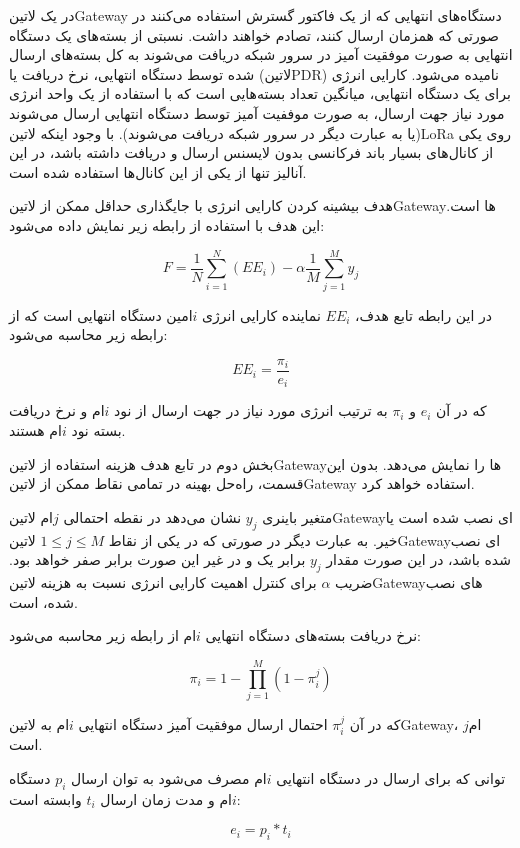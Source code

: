 در یک ‌لاتین{Gateway} دستگاه‌های انتهایی که از یک فاکتور گسترش استفاده می‌کنند در صورتی که همزمان ارسال کنند،
تصادم خواهند داشت. نسبتی از بسته‌های یک دستگاه انتهایی به صورت موفقیت آمیز در سرور شبکه دریافت می‌شوند به کل
بسته‌های ارسال شده توسط دستگاه انتهایی، نرخ دریافت یا (‌لاتین{PDR}) نامیده می‌شود.
کارایی انرژی برای یک دستگاه انتهایی، میانگین تعداد بسته‌هایی است که
با استفاده از یک واحد انرژی مورد نیاز جهت ارسال،
به صورت موففیت آمیز توسط دستگاه انتهایی ارسال
می‌شوند (یا به عبارت دیگر در سرور شبکه دریافت می‌شوند).
با وجود اینکه ‌لاتین{LoRa} روی یکی از کانال‌های بسیار باند فرکانسی بدون لایسنس ارسال و دریافت
داشته باشد، در این آنالیز تنها از یکی از این کانال‌ها استفاده شده است.

هدف بیشینه کردن کارایی انرژی با جایگذاری حداقل ممکن از ‌لاتین{Gateway}ها است.
این هدف با استفاده از رابطه زیر نمایش داده می‌شود:

\[
  F = \frac{1}{N} \sum_{i=1}^{N}(EE_{i}) - \alpha \frac{1}{M} \sum_{j=1}^{M}y_{j}
\]

در این رابطه تابع هدف،
$EE_{i}$
نماینده کارایی انرژی $i$امین دستگاه انتهایی است که از رابطه زیر محاسبه می‌شود:

\[
  EE_{i} = \frac{\pi_{i}}{e_{i}}
\]

که در آن $e_{i}$ و $\pi_{i}$
به ترتیب انرژی مورد نیاز در جهت ارسال از نود $i$ام
و نرخ دریافت بسته نود $i$ام هستند.

بخش دوم در تابع هدف هزینه استفاده از ‌لاتین{Gateway}ها را نمایش می‌دهد.
بدون این قسمت، راه‌حل بهینه در تمامی نقاط ممکن از ‌لاتین{Gateway} استفاده
خواهد کرد.

متغیر باینری $y_{j}$ نشان می‌دهد در نقطه احتمالی $j$ام
‌لاتین{Gateway}ای نصب شده است یا خیر. به عبارت دیگر
در صورتی که در یکی از نقاط
$1 \le j \le M$
‌لاتین{Gateway}ای نصب شده باشد، در این صورت مقدار $y_{j}$ برابر یک و در غیر این صورت برابر صفر خواهد بود.
ضریب $\alpha$ برای کنترل اهمیت کارایی انرژی نسبت به هزینه ‌لاتین{Gateway}های نصب شده، است.

نرخ دریافت بسته‌های دستگاه انتهایی $i$ام از رابطه زیر محاسبه می‌شود:

\[
  \pi_{i} = 1 - \prod_{j=1}^{M}(1 - \pi_{i}^{j})
\]

که در آن $\pi_{i}^{j}$ احتمال ارسال موفقیت آمیز دستگاه انتهایی $i$ام
به ‌لاتین{Gateway}،
$j$ام است.

توانی که برای ارسال در دستگاه انتهایی $i$ام مصرف می‌شود به توان ارسال
$p_{i}$ دستگاه $i$ام و مدت زمان ارسال $t_{i}$
وابسته است:

\[
  e_{i} = p_{i} * t_{i}
\]

